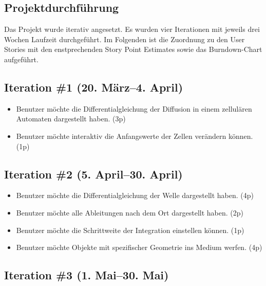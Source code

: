 \documentclass[11pt]{scrreprt} %
\theoremstyle{definition}
\begin{document}
\begin{appendix}

\chapter{Projektdurchführung}

Das Projekt wurde iterativ angesetzt. Es wurden vier Iterationen mit jeweils drei Wochen Laufzeit durchgeführt. Im Folgenden ist die Zuordnung zu den User Stories mit den enstprechenden Story Point Estimates sowie das Burndown-Chart aufgeführt.

\section{Iteration \#1 (20. März--4. April)}
\begin{itemize}
\item Benutzer möchte die Differentialgleichung der Diffusion in einem zellulären Automaten dargestellt haben. (3p) 
\item Benutzer möchte interaktiv die Anfangswerte der Zellen verändern können. (1p)
\end{itemize}


\section{Iteration \#2 (5. April--30. April)}

\begin{itemize}
\item Benutzer möchte die Differentialgleichung der Welle dargestellt haben. (4p) 
\item Benutzer möchte alle Ableitungen nach dem Ort dargestellt haben. (2p) 
\item Benutzer möchte die Schrittweite der Integration einstellen können. (1p) 
\item Benutzer möchte Objekte mit spezifischer Geometrie ins Medium werfen. (4p)
\end{itemize}


\section{Iteration \#3 (1. Mai--30. Mai)}


\end{appendix}
\end{document}
